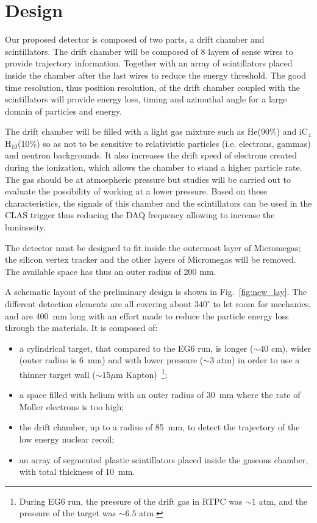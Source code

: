 \section{Design}

Our proposed detector is composed of two parts, a drift chamber and 
scintillators. The drift chamber will be composed of 8 layers of sense wires to 
provide trajectory information. Together with an array of scintillators placed 
inside the chamber after the last wires to reduce the energy threshold. The 
good time resolution, thus position resolution, of the drift chamber coupled 
with the scintillators will provide energy loss, timing and azimuthal angle for 
a large domain of particles and energy.


The drift chamber will be filled with a light gas mixture such as He(90\%) and 
iC$_4$H$_10$(10\%) so as not to be sensitive to relativistic particles (i.e.  
electrons, gammas) and neutron backgrounds. It also increases the drift speed 
of electrons created during the ionization, which allows the chamber to stand a 
higher particle rate. The gas should be at atmospheric pressure but studies 
will be carried out to evaluate the possibility of working at a lower pressure.  
Based on these characteristics, the signals of this chamber and the 
scintillators can be used in the CLAS trigger thus reducing the DAQ frequency 
allowing to increase the luminosity.


The detector must be designed to fit inside the outermost layer of Micromegas; 
the silicon vertex tracker and the other layers of Micromegas will be removed.  
The available space has thus an outer radius of 200 mm.


A schematic layout of the preliminary design is shown in 
Fig.~\ref{fig:new_lay}. The different detection elements are all covering about 
$340^{\circ}$ to let room for mechanics, and are 400~mm long with an effort 
made to reduce the particle energy loss through the materials. It is composed 
of:
\begin{itemize}
\item a cylindrical target, that compared to the EG6 run, is longer ($\sim \!40$ cm), wider (outer radius is 6~mm) and with lower pressure ($\sim \!3$ atm) in order to use a thinner target wall ($\sim \!15\mu$m Kapton)~\footnote{During EG6 run, the pressure of the drift gas in RTPC was $\sim \!1$ atm, and the pressure of the target was $\sim \!6.5$ atm.};
\item a space filled with helium with an outer radius of 30~mm where the rate of Moller electrons is too high;
\item the drift chamber, up to a radius of 85~mm, to detect the trajectory of the low energy nuclear recoil;
\item an array of segmented plastic scintillators placed inside the gaseous chamber, with total thickness of 10~mm.
\end{itemize}



